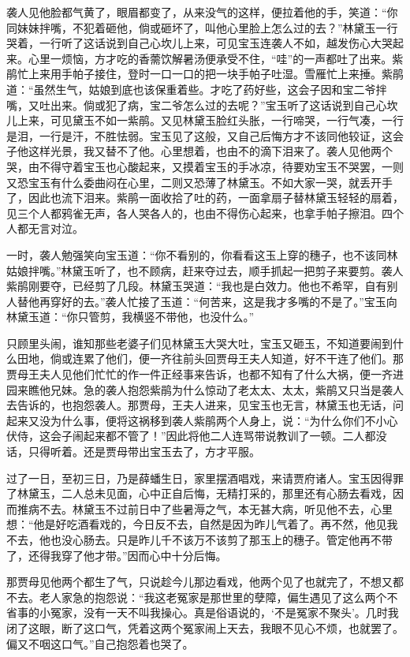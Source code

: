 袭人见他脸都气黄了，眼眉都变了，从来没气的这样，便拉着他的手，笑道：``你同妹妹拌嘴，不犯着砸他，倘或砸坏了，叫他心里脸上怎么过的去？''林黛玉一行哭着，一行听了这话说到自己心坎儿上来，可见宝玉连袭人不如，越发伤心大哭起来。心里一烦恼，方才吃的香薷饮解暑汤便承受不住，``哇''的一声都吐了出来。紫鹃忙上来用手帕子接住，登时一口一口的把一块手帕子吐湿。雪雁忙上来捶。紫鹃道：``虽然生气，姑娘到底也该保重着些。才吃了药好些，这会子因和宝二爷拌嘴，又吐出来。倘或犯了病，宝二爷怎么过的去呢？''宝玉听了这话说到自己心坎儿上来，可见黛玉不如一紫鹃。又见林黛玉脸红头胀，一行啼哭，一行气凑，一行是泪，一行是汗，不胜怯弱。宝玉见了这般，又自己后悔方才不该同他较证，这会子他这样光景，我又替不了他。心里想着，也由不的滴下泪来了。袭人见他两个哭，由不得守着宝玉也心酸起来，又摸着宝玉的手冰凉，待要劝宝玉不哭罢，一则又恐宝玉有什么委曲闷在心里，二则又恐薄了林黛玉。不如大家一哭，就丢开手了，因此也流下泪来。紫鹃一面收拾了吐的药，一面拿扇子替林黛玉轻轻的扇着，见三个人都鸦雀无声，各人哭各人的，也由不得伤心起来，也拿手帕子擦泪。四个人都无言对泣。

一时，袭人勉强笑向宝玉道：``你不看别的，你看看这玉上穿的穗子，也不该同林姑娘拌嘴。''林黛玉听了，也不顾病，赶来夺过去，顺手抓起一把剪子来要剪。袭人紫鹃刚要夺，已经剪了几段。林黛玉哭道：``我也是白效力。他也不希罕，自有别人替他再穿好的去。''袭人忙接了玉道：``何苦来，这是我才多嘴的不是了。''宝玉向林黛玉道：``你只管剪，我横竖不带他，也没什么。''

只顾里头闹，谁知那些老婆子们见林黛玉大哭大吐，宝玉又砸玉，不知道要闹到什么田地，倘或连累了他们，便一齐往前头回贾母王夫人知道，好不干连了他们。那
贾母王夫人见他们忙忙的作一件正经事来告诉，也都不知有了什么大祸，便一齐进园来瞧他兄妹。急的袭人抱怨紫鹃为什么惊动了老太太、太太，紫鹃又只当是袭人去告诉的，也抱怨袭人。那贾母，王夫人进来，见宝玉也无言，林黛玉也无话，问起来又没为什么事，便将这祸移到袭人紫鹃两个人身上，说：``为什么你们不小心伏侍，这会子闹起来都不管了！''因此将他二人连骂带说教训了一顿。二人都没话，只得听着。还是贾母带出宝玉去了，方才平服。

过了一日，至初三日，乃是薛蟠生日，家里摆酒唱戏，来请贾府诸人。宝玉因得罪了林黛玉，二人总未见面，心中正自后悔，无精打采的，那里还有心肠去看戏，因而推病不去。林黛玉不过前日中了些暑溽之气，本无甚大病，听见他不去，心里想：``他是好吃酒看戏的，今日反不去，自然是因为昨儿气着了。再不然，他见我不去，他也没心肠去。只是昨儿千不该万不该剪了那玉上的穗子。管定他再不带了，还得我穿了他才带。''因而心中十分后悔。

那贾母见他两个都生了气，只说趁今儿那边看戏，他两个见了也就完了，不想又都不去。老人家急的抱怨说：``我这老冤家是那世里的孽障，偏生遇见了这么两个不省事的小冤家，没有一天不叫我操心。真是俗语说的，`不是冤家不聚头'。几时我闭了这眼，断了这口气，凭着这两个冤家闹上天去，我眼不见心不烦，也就罢了。偏又不咽这口气。''自己抱怨着也哭了。

